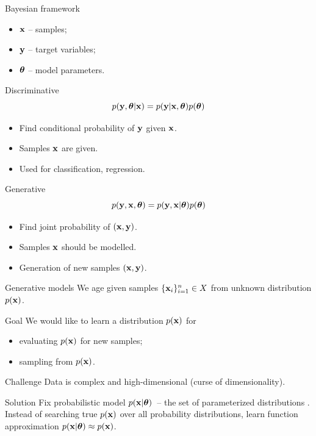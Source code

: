\begin{frame}{Bayesian framework}
\begin{itemize}
    \item $\mathbf{x}$ -- samples;
    \item $\mathbf{y}$ -- target variables;
    \item $\boldsymbol{\theta}$ -- model parameters.
\end{itemize}
\begin{minipage}[t]{0.5\columnwidth}
\begin{block}{Discriminative}
    \[
        p(\mathbf{y}, \boldsymbol{\theta} | \mathbf{x}) = p(\mathbf{y} | \mathbf{x}, \boldsymbol{\theta}) p(\boldsymbol{\theta})
    \]
    \begin{itemize}
        \item Find conditional probability of $\mathbf{y}$ given $\mathbf{x}$. \\
        \item Samples $\mathbf{x}$ are given. \\
        \item Used for classification, regression.
    \end{itemize}
\end{block}
\end{minipage}%
\begin{minipage}[t]{0.5\columnwidth}
\begin{block}{Generative}
    \[
        p(\mathbf{y}, \mathbf{x}, \boldsymbol{\theta}) = p(\mathbf{y}, \mathbf{x} | \boldsymbol{\theta}) p(\boldsymbol{\theta})
    \]
    \begin{itemize}
        \item Find joint probability of $(\mathbf{x}, \mathbf{y})$.
        \item Samples $\mathbf{x}$ should be modelled. \\
        \item Generation of new samples $(\mathbf{x}, \mathbf{y})$.
    \end{itemize}
\end{block}
\end{minipage}
\end{frame}
\begin{frame}{Generative models}
    We age given samples $\{\mathbf{x}_i\}_{i=1}^n \in X$ from unknown distribution $p(\mathbf{x})$.
    
    \begin{block}{Goal}
    	We would like to learn a distribution $p(\mathbf{x})$ for 
    	\begin{itemize}
    	    \item evaluating $p(\mathbf{x})$ for new samples;
    	    \item sampling from $p(\mathbf{x})$.
    	\end{itemize}
    \end{block}
    \begin{block}{Challenge}
    	 Data is complex and high-dimensional (curse of dimensionality).
    \end{block}
    \begin{block}{Solution}
        Fix probabilistic model $p(\mathbf{x} | \boldsymbol{\theta})$~-- the set of parameterized distributions . \\
        Instead of searching true $p(\mathbf{x})$ over all probability distributions, learn function approximation $p(\mathbf{x} | \boldsymbol{\theta}) \approx p(\mathbf{x})$.
    \end{block}
\end{frame}
